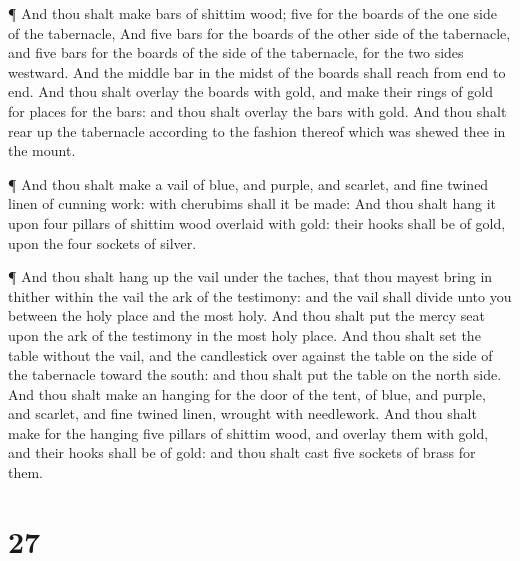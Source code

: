  ¶ And thou shalt make bars of shittim wood; five for the
boards of the one side of the tabernacle,  And five bars
for the boards of the other side of the tabernacle, and five bars for
the boards of the side of the tabernacle, for the two sides westward.
 And the middle bar in the midst of the boards shall reach
from end to end.  And thou shalt overlay the boards with
gold, and make their rings of gold for places for the bars: and thou
shalt overlay the bars with gold.  And thou shalt rear up
the tabernacle according to the fashion thereof which was shewed thee in
the mount.

 ¶ And thou shalt make a vail of blue, and purple, and
scarlet, and fine twined linen of cunning work: with cherubims shall it
be made:  And thou shalt hang it upon four pillars of
shittim wood overlaid with gold: their hooks shall be of gold, upon the
four sockets of silver.

 ¶ And thou shalt hang up the vail under the taches, that
thou mayest bring in thither within the vail the ark of the testimony:
and the vail shall divide unto you between the holy place and the most
holy.  And thou shalt put the mercy seat upon the ark of
the testimony in the most holy place.  And thou shalt set
the table without the vail, and the candlestick over against the table
on the side of the tabernacle toward the south: and thou shalt put the
table on the north side.  And thou shalt make an hanging
for the door of the tent, of blue, and purple, and scarlet, and fine
twined linen, wrought with needlework.  And thou shalt make
for the hanging five pillars of shittim wood, and overlay them with
gold, and their hooks shall be of gold: and thou shalt cast five sockets
of brass for them.

\hypertarget{section-26}{%
\section{27}\label{section-26}}

